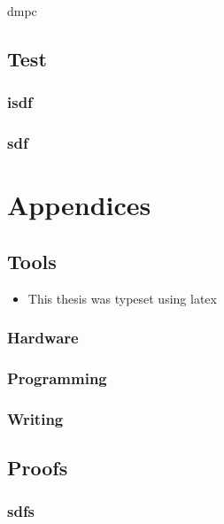 \documentclass{these-dbl}
\begin{document}
\gls{dmpc}

\cite{YangEtAl2022}
\printbibliography%


\chapter{Test}
\minitoc
\section{isdf}

\section{sdf}

\cite{AlessioBemporad2009}
\cite{YangEtAl2022}
\printbibliography%


\appendix
\part{Appendices}
\chapter{Tools}
\minitoc
\begin{itemize}
  \item This thesis was typeset using \gls{latex}

\end{itemize}

\section{Hardware}
\section{Programming}
\section{Writing}
\section{}
\chapter{Proofs}
\minitoc
\section{sdfs}

\makebackcover
\end{document}
